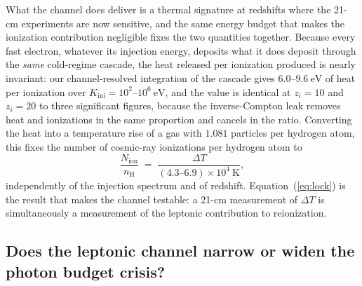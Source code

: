 \documentclass[twocolumn]{article}
\begin{document}
What the channel does deliver is a thermal signature at redshifts where the
21-cm experiments are now sensitive, and the same energy budget that makes the
ionization contribution negligible fixes the two quantities together. Because
every fast electron, whatever its injection energy, deposits what it does
deposit through the \emph{same} cold-regime cascade, the heat released per
ionization produced is nearly invariant: our channel-resolved integration of
the cascade gives $6.0$--$9.6\ \mathrm{eV}$ of heat per ionization over
$K_{\mathrm{ini}} = 10^{2}$--$10^{6}\ \mathrm{eV}$, and the value is identical
at $z_i = 10$ and $z_i = 20$ to three significant figures, because the
inverse-Compton leak removes heat and ionizations in the same proportion and
cancels in the ratio. Converting the heat into a temperature rise of a gas with
$1.081$ particles per hydrogen atom, this fixes the number of cosmic-ray
ionizations per hydrogen atom to
\begin{equation}
  \frac{N_{\mathrm{ion}}}{n_{\mathrm{H}}}
  \;=\; \frac{\Delta T}{\left(4.3\text{--}6.9\right)\times10^{4}\ \mathrm{K}} ,
  \label{eq:lock}
\end{equation}
independently of the injection spectrum and of redshift. Equation~(\ref{eq:lock})
is the result that makes the channel testable: a 21-cm measurement of $\Delta T$
is simultaneously a measurement of the leptonic contribution to reionization.

\subsection{Does the leptonic channel narrow or widen the photon budget crisis?}
\label{sec:budget}
\end{document}
